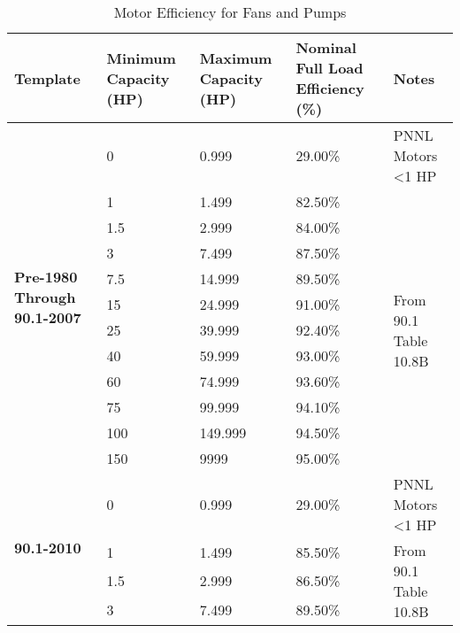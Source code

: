 \begin{table}[]
\centering
\small
\caption{Motor Efficiency for Fans and Pumps}
\label{tab:fan_motor_efficiencies}
\begin{tabular}{|p{1.4cm}|p{1.5cm}|p{1.5cm}|p{1.5cm}|p{2cm}|}
\hline
\textbf{Template} &
  \textbf{Minimum Capacity (HP)} &
  \textbf{Maximum Capacity (HP)} &
  \textbf{Nominal Full Load Efficiency (\%)} &
  \textbf{Notes} \\ \hline
\multirow{12}{*}{\parbox{1.4cm}{\textbf{Pre-1980 Through 90.1-2007}}}
 & 0       & 0.999   & 29.00\% & PNNL Motors \textless 1 HP \\ \cline{2-4} \cline{5-5} 
 & 1       & 1.499   & 82.50\% & \multirow{11}{*}{\parbox{2cm}{From 90.1 Table 10.8B}}   \\ \cline{2-4}
 & 1.5     & 2.999   & 84.00\% &                                           \\ \cline{2-4}
 & 3       & 7.499   & 87.50\% &                                           \\ \cline{2-4}
 & 7.5     & 14.999  & 89.50\% &                                           \\ \cline{2-4}
 & 15      & 24.999  & 91.00\% &                                           \\ \cline{2-4}
 & 25      & 39.999  & 92.40\% &                                           \\ \cline{2-4}
 & 40      & 59.999  & 93.00\% &                                           \\ \cline{2-4}
 & 60      & 74.999  & 93.60\% &                                           \\ \cline{2-4}
 & 75      & 99.999  & 94.10\% &                                           \\ \cline{2-4}
 & 100     & 149.999 & 94.50\% &                                           \\ \cline{2-4}
 & 150     & 9999    & 95.00\% &                                           \\ \cline{1-4} \cline{5-5}
\multirow{14}{*}{\textbf{90.1-2010}}
 & 0       & 0.999   & 29.00\% & PNNL Motors \textless 1 HP                 \\ \cline{2-4} \cline{5-5} 
 & 1       & 1.499   & 85.50\% & \multirow{13}{*}{\parbox{2cm}{From 90.1 Table 10.8B}}   \\ \cline{2-4}
 & 1.5     & 2.999   & 86.50\% &                                           \\ \cline{2-4}
 & 3       & 7.499   & 89.50\% &                                           \\ \cline{2-4}

\end{tabular}
\end{table}
